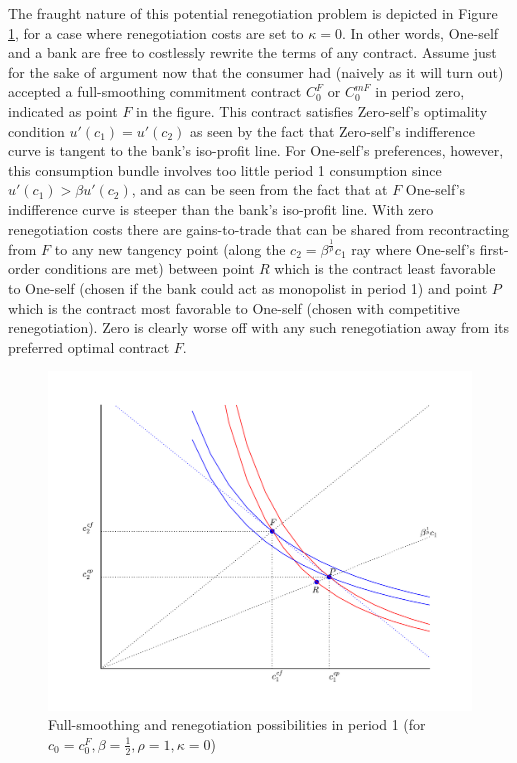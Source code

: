 \documentclass[11pt,english]{article}
\theoremstyle{plain}
\theoremstyle{definition}
\begin{document}
The fraught nature of this potential renegotiation problem
is depicted in Figure \ref{fig:c1c2}, for a case where renegotiation
costs are set to $\kappa=0$. In other words, One-self and a bank
are free to costlessly rewrite the terms of any contract. Assume \textendash{}
just for the sake of argument now \textendash{} that the consumer
had (naively as it will turn out) accepted a full-smoothing commitment
contract $C_{0}^{F}$ or $C_{0}^{mF}$ in period zero, indicated as
point $F$ in the figure. This contract satisfies Zero-self's optimality
condition $u'(c_{1})=u'(c_{2})$ as seen by the fact that Zero-self's
indifference curve is tangent to the bank's iso-profit line. For One-self's
preferences, however, this consumption bundle involves too little
period 1 consumption since $u'(c_{1})>\beta u'(c_{2})$, and as can
be seen from the fact that at $F$ One-self's indifference curve is
steeper than the bank's iso-profit line. With zero renegotiation costs
there are gains-to-trade that can be shared from recontracting from
$F$ to any new tangency point (along the $c_{2}=\beta^{\frac{1}{\rho}}c_{1}$
ray where One-self's first-order conditions are met) between point
$R$ which is the contract least favorable to One-self (chosen if
the bank could act as monopolist in period 1) and point $P$ which
is the contract most favorable to One-self (chosen with competitive
renegotiation). Zero is clearly worse off with any such renegotiation
away from its preferred optimal contract $F$.

\begin{figure}
\includegraphics[width=\textwidth]{fig_selfcontrol.pdf}
\caption[Full-commitment and renegotiation-proof contracts under competition]{Full-smoothing and renegotiation possibilities in period 1 (for \protect
\protect \\
 $c_{0}=c_{0}^{F},\beta=\frac{1}{2},\rho=1,\kappa=0$)}

\label{fig:c1c2} 
\end{figure}
\end{document}
